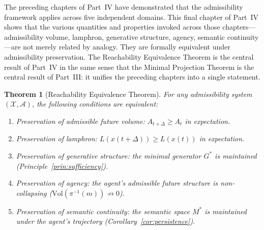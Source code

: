 \documentclass[12pt, oneside]{book}
\theoremstyle{flyxion}
\newtheorem{theorem}{Theorem}[chapter]
\theoremstyle{definition}
\begin{document}
The preceding chapters of Part~IV have demonstrated
that the admissibility framework applies across five
independent domains. This final chapter of Part~IV
shows that the various quantities and properties
invoked across those chapters---admissibility volume,
lamphron, generative structure, agency, semantic
continuity---are not merely related by analogy.
They are formally equivalent under admissibility
preservation. The Reachability Equivalence Theorem
is the central result of Part~IV in the same sense
that the Minimal Projection Theorem is the central
result of Part~III: it unifies the preceding chapters
into a single statement.

\begin{theorem}[Reachability Equivalence Theorem]
\label{thm:reachability_equiv}
For any admissibility system $(\mathcal{X}, \mathcal{A})$,
the following conditions are equivalent:
\begin{enumerate}
\item[(i)] Preservation of admissible future volume:
   $A_{t+\Delta} \geq A_t$ in expectation.
\item[(ii)] Preservation of lamphron:
   $L(x(t+\Delta)) \geq L(x(t))$ in expectation.
\item[(iii)] Preservation of generative structure:
   the minimal generator $G^*$ is maintained
   (Principle~\ref{prin:sufficiency}).
\item[(iv)] Preservation of agency: the agent's
   admissible future structure is non-collapsing
   ($\mathrm{Vol}(\pi^{-1}(m)) \not\to 0$).
\item[(v)] Preservation of semantic continuity:
   the semantic space $M^*$ is maintained
   under the agent's trajectory
   (Corollary~\ref{cor:persistence}).
\end{enumerate}
\end{theorem}
\end{document}
